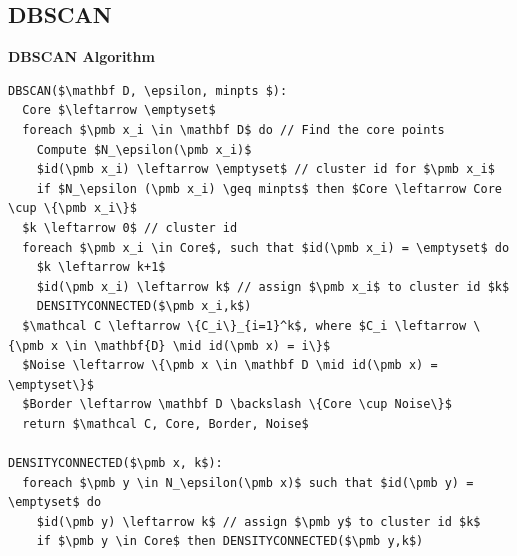 \documentclass[a4, english]{article}
\begin{document}
\subsection{DBSCAN}
\begin{framed}  
\begin{center}  
  \textbf{DBSCAN Algorithm}  
\end{center}
\begin{lstlisting}[mathescape=true, keywordstyle=\ttfamily]
DBSCAN($\mathbf D, \epsilon, minpts $):
  Core $\leftarrow \emptyset$ 
  foreach $\pmb x_i \in \mathbf D$ do // Find the core points
    Compute $N_\epsilon(\pmb x_i)$ 
    $id(\pmb x_i) \leftarrow \emptyset$ // cluster id for $\pmb x_i$ 
    if $N_\epsilon (\pmb x_i) \geq minpts$ then $Core \leftarrow Core \cup \{\pmb x_i\}$ 
  $k \leftarrow 0$ // cluster id 
  foreach $\pmb x_i \in Core$, such that $id(\pmb x_i) = \emptyset$ do  
    $k \leftarrow k+1$ 
    $id(\pmb x_i) \leftarrow k$ // assign $\pmb x_i$ to cluster id $k$ 
    DENSITYCONNECTED($\pmb x_i,k$)
  $\mathcal C \leftarrow \{C_i\}_{i=1}^k$, where $C_i \leftarrow \{\pmb x \in \mathbf{D} \mid id(\pmb x) = i\}$ 
  $Noise \leftarrow \{\pmb x \in \mathbf D \mid id(\pmb x) = \emptyset\}$
  $Border \leftarrow \mathbf D \backslash \{Core \cup Noise\}$ 
  return $\mathcal C, Core, Border, Noise$ 

DENSITYCONNECTED($\pmb x, k$):
  foreach $\pmb y \in N_\epsilon(\pmb x)$ such that $id(\pmb y) = \emptyset$ do
    $id(\pmb y) \leftarrow k$ // assign $\pmb y$ to cluster id $k$ 
    if $\pmb y \in Core$ then DENSITYCONNECTED($\pmb y,k$)  
\end{lstlisting}
\end{framed}
\end{document}
